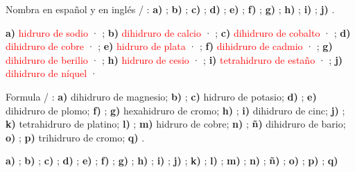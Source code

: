 \begin{exercise}
    Nombra en español y en inglés / : \textbf{a)} ; \textbf{b)} ; \textbf{c)} ; \textbf{d)} ; \textbf{e)} ; \textbf{f)} ; \textbf{g)} ; \textbf{h)} ; \textbf{i)} ; \textbf{j)} .
    \begin{solu}
        \textbf{a)} \textcolor{red}{hidruro de sodio} · \textcolor{red}{}; \textbf{b)} \textcolor{red}{dihidruro de calcio} · \textcolor{red}{}; \textbf{c)} \textcolor{red}{dihidruro de cobalto} · \textcolor{red}{}; \textbf{d)} \textcolor{red}{dihidruro de cobre} · \textcolor{red}{}; \textbf{e)} \textcolor{red}{hidruro de plata} · \textcolor{red}{}; \textbf{f)} \textcolor{red}{dihidruro de cadmio} · \textcolor{red}{}; \textbf{g)} \textcolor{red}{dihidruro de berilio} · \textcolor{red}{}; \textbf{h)} \textcolor{red}{hidruro de cesio} · \textcolor{red}{}; \textbf{i)} \textcolor{red}{tetrahidruro de estaño} · \textcolor{red}{}; \textbf{j)} \textcolor{red}{dihidruro de níquel} · \textcolor{red}{}
    \end{solu}
\end{exercise}

\begin{exercise}
    Formula / : \textbf{a)} dihidruro de magnesio; \textbf{b)} ; \textbf{c)} hidruro de potasio; \textbf{d)} ; \textbf{e)} dihidruro de plomo; \textbf{f)} ; \textbf{g)} hexahidruro de cromo; \textbf{h)} ; \textbf{i)} dihidruro de cinc; \textbf{j)} ; \textbf{k)} tetrahidruro de platino; \textbf{l)} ; \textbf{m)} hidruro de cobre; \textbf{n)} ; \textbf{ñ)} dihidruro de bario; \textbf{o)} ; \textbf{p)} trihidruro de cromo; \textbf{q)} .
    \begin{solu}
        \textbf{a)} \textcolor{red}{}; \textbf{b)} \textcolor{red}{}; \textbf{c)} \textcolor{red}{}; \textbf{d)} \textcolor{red}{}; \textbf{e)} \textcolor{red}{}; \textbf{f)} \textcolor{red}{}; \textbf{g)} \textcolor{red}{}; \textbf{h)} \textcolor{red}{}; \textbf{i)} \textcolor{red}{}; \textbf{j)} \textcolor{red}{}; \textbf{k)} \textcolor{red}{}; \textbf{l)} \textcolor{red}{}; \textbf{m)} \textcolor{red}{}; \textbf{n)} \textcolor{red}{}; \textbf{ñ)} \textcolor{red}{}; \textbf{o)} \textcolor{red}{}; \textbf{p)} \textcolor{red}{}; \textbf{q)} \textcolor{red}{}
    \end{solu}
\end{exercise}

